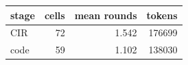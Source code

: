 \begin{tabular}{lrrr}
\toprule
stage & cells & mean rounds & tokens \\
\midrule
CIR & 72 & 1.542 & 176699 \\
code & 59 & 1.102 & 138030 \\
\bottomrule
\end{tabular}

